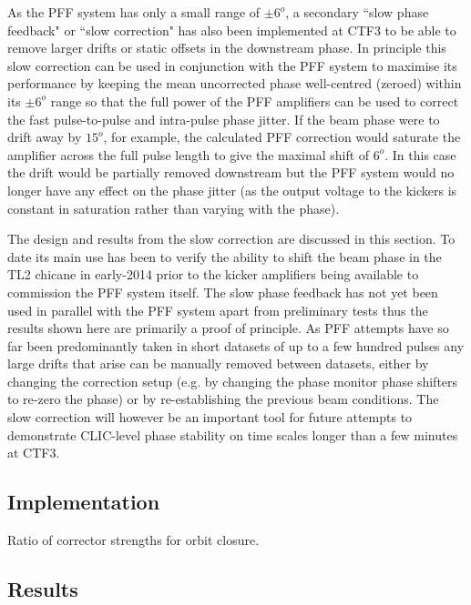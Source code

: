 
As the PFF system has only a small range of \(\pm6^{o}\), a secondary ``slow phase feedback" or ``slow correction" has also been implemented at CTF3 to be able to remove larger drifts or static offsets in the downstream phase. In principle this slow correction can be used in conjunction with the PFF system to maximise its performance by keeping the mean uncorrected phase well-centred (zeroed) within its \(\pm6^{o}\) range so that the full power of the PFF amplifiers can be used to correct the fast pulse-to-pulse and intra-pulse phase jitter. If the beam phase were to drift away by \(15^{o}\), for example, the calculated PFF correction would saturate the amplifier across the full pulse length to give the maximal shift of \(6^{o}\). In this case the drift would be partially removed downstream but the PFF system would no longer have any effect on the phase jitter (as the output voltage to the kickers is constant in saturation rather than varying with the phase).

The design and results from the slow correction are discussed in this section. To date its main use has been to verify the ability to shift the beam phase in the TL2 chicane in early-2014 prior to the kicker amplifiers being available to commission the PFF system itself. The slow phase feedback has not yet been used in parallel with the PFF system apart from preliminary tests thus the results shown here are primarily a proof of principle. As PFF attempts have so far been predominantly taken in short datasets of up to a few hundred pulses any large drifts that arise can be manually removed between datasets, either by changing the correction setup (e.g. by changing the phase monitor phase shifters to re-zero the phase) or by re-establishing the previous beam conditions. The slow correction will however be an important tool for future attempts to demonstrate CLIC-level phase stability on time scales longer than a few minutes at CTF3.

\subsection{Implementation}
\label{ss:slowCorrMethod}

Ratio of corrector strengths for orbit closure.

\subsection{Results}
\label{ss:slowCorrResults}




